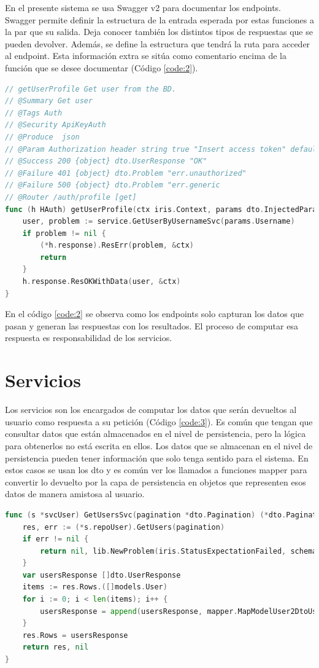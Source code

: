 En el presente sistema se usa Swagger v2 para documentar los endpoints. Swagger permite definir la estructura de la entrada esperada por estas funciones a la par que su salida. Deja conocer también los distintos tipos de respuestas que se pueden devolver. Además, se define la estructura que tendrá la ruta para acceder al endpoint. Esta información extra se sitúa como comentario encima de la función que se desee documentar (Código \ref{code:2}).
\begin{lstlisting}[language=Go,caption={Endpoint para obtener los datos del usuario actualmente autenticado}, label={code:2}]
// getUserProfile Get user from the BD.
// @Summary Get user
// @Tags Auth
// @Security ApiKeyAuth
// @Produce  json
// @Param Authorization header string true "Insert access token" default(Bearer <Add access token here>)
// @Success 200 {object} dto.UserResponse "OK"
// @Failure 401 {object} dto.Problem "err.unauthorized"
// @Failure 500 {object} dto.Problem "err.generic
// @Router /auth/profile [get]
func (h HAuth) getUserProfile(ctx iris.Context, params dto.InjectedParam, service service.ISvcUser) {
	user, problem := service.GetUserByUsernameSvc(params.Username)
	if problem != nil {
		(*h.response).ResErr(problem, &ctx)
		return
	}
	h.response.ResOKWithData(user, &ctx)
}
\end{lstlisting}

En el código \ref{code:2} se observa como los endpoints solo capturan los datos que pasan y generan las respuestas con los resultados. El proceso de computar esa respuesta es responsabilidad de los servicios.

\section{Servicios}
Los servicios son los encargados de computar los datos que serán devueltos al usuario como respuesta a su petición (Código \ref{code:3}). Es común que tengan que consultar datos que están almacenados en el nivel de persistencia, pero la lógica para obtenerlos no está escrita en ellos. Los datos que se almacenan en el nivel de persistencia pueden tener información que solo tenga sentido para el sistema. En estos casos se usan los dto y es común ver los llamados a funciones mapper para convertir lo devuelto por la capa de persistencia en objetos que representen esos datos de manera amistosa al usuario.

\begin{lstlisting}[language=Go,caption={Servicio para obtener los usuarios de la base de datos}, label={code:3}]
func (s *svcUser) GetUsersSvc(pagination *dto.Pagination) (*dto.Pagination, *dto.Problem) {
	res, err := (*s.repoUser).GetUsers(pagination)
	if err != nil {
		return nil, lib.NewProblem(iris.StatusExpectationFailed, schema.ErrBuntdb, err.Error())
	}
	var usersResponse []dto.UserResponse
	items := res.Rows.([]models.User)
	for i := 0; i < len(items); i++ {
		usersResponse = append(usersResponse, mapper.MapModelUser2DtoUserResponse(items[i]))
	}
	res.Rows = usersResponse
	return res, nil
}
\end{lstlisting}

